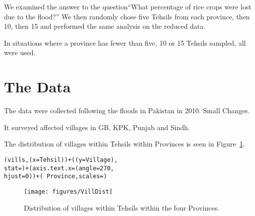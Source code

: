 \documentclass{article}\usepackage{knitr}
\begin{document}
We examined the answer to the question``What percentage of rice crops were lost due to the flood?''  We then randomly chose five Tehsils from each province, then 10, then 15 and performed the same analysis on the reduced data.

In situations where a province has fewer than five, 10 or 15 Tehsils sampled, all were used.







\section{The Data}
\label{sec:thedata}


The data were collected following the floods in Pakistan in 2010. Small Changes.

It surveyed affected villages in GB, KPK, Punjab and Sindh.


The distribution of villages within Tehsils within Provinces is seen in Figure~\ref{fig:VillDist}.

\begin{knitrout}
\color{fgcolor}\begin{kframe}
\begin{alltt}
(vills, (x = Tehsil)) + ((y = Village), 
    stat = ) + (axis.text.x = (angle = 270, 
    hjust = 0)) + (~Province, scales = )
\end{alltt}
\end{kframe}\begin{figure}[!hbtp]


{\centering \texttt{[image: figures/VillDist]} 

}

\caption[Distribution of villages within Tehsils]{Distribution of villages within Tehsils within the four Provinces.\label{fig:VillDist}}
\end{figure}


\end{knitrout}
\end{document}
